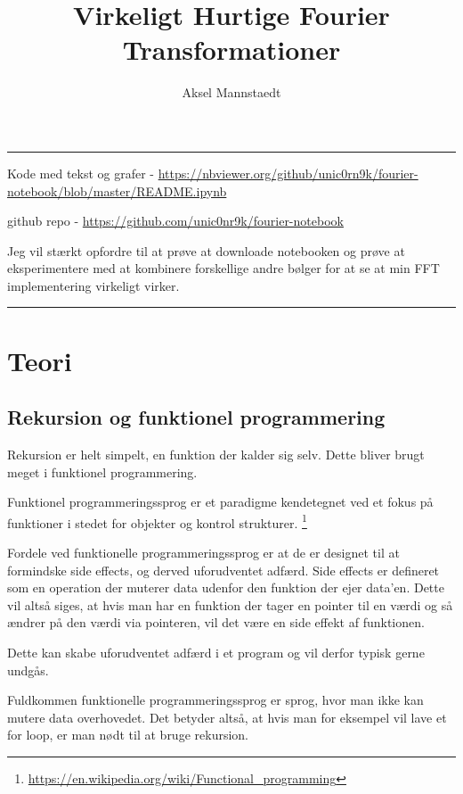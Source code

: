 \documentclass[11pt,a4paper]{article}
\author{Aksel Mannstaedt}
\date{}
\title{Virkeligt Hurtige Fourier Transformationer}
\begin{document}
\maketitle
\noindent\rule{\textwidth}{0.5pt}
Kode med tekst og grafer - \url{https://nbviewer.org/github/unic0rn9k/fourier-notebook/blob/master/README.ipynb}

github repo - \url{https://github.com/unic0nr9k/fourier-notebook}

\bigskip

Jeg vil stærkt opfordre til at prøve at downloade notebooken og prøve at eksperimentere med at kombinere forskellige andre bølger for at se at min FFT implementering virkeligt virker.

\noindent\rule{\textwidth}{0.5pt}

\setcounter{tocdepth}{2}
\tableofcontents

\newpage

\section{Teori}
\label{sec:org57a16be}
\subsection{Rekursion og funktionel programmering}
\label{sec:orgeddf27c}

Rekursion er helt simpelt, en funktion der kalder sig selv.
Dette bliver brugt meget i funktionel programmering.

Funktionel programmeringssprog er et paradigme kendetegnet ved
et fokus på funktioner i stedet for objekter og kontrol strukturer. \footnote{\url{https://en.wikipedia.org/wiki/Functional\_programming}}

\bigskip

Fordele ved funktionelle programmeringssprog er at de er designet til at formindske side effects,
og derved uforudventet adfærd.
Side effects er defineret som en operation der muterer data udenfor den funktion der ejer data'en.
Dette vil altså siges, at hvis man har en funktion der tager en pointer til en værdi og så ændrer på
den værdi via pointeren, vil det være en side effekt af funktionen.

Dette kan skabe uforudventet adfærd i et program og vil derfor typisk gerne undgås.

Fuldkommen funktionelle programmeringssprog er sprog, hvor man ikke kan mutere data overhovedet.
Det betyder altså, at hvis man for eksempel vil lave et for loop, er man nødt til at bruge rekursion.
\end{document}
